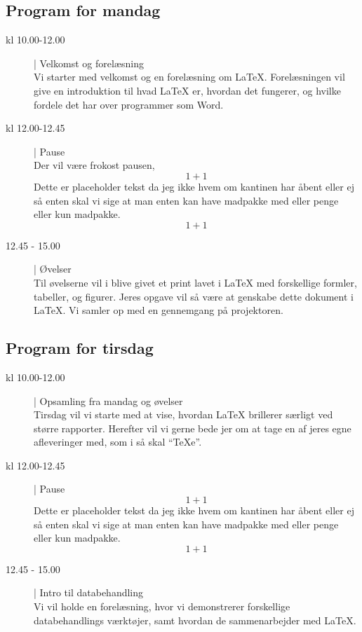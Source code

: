 \documentclass{article}                                                        %
\begin{document}
    \subsection{Program for mandag}
    \begin{description}
        \item[kl 10.00-12.00] | Velkomst og forelæsning ~ \\
        Vi starter med velkomst og en forelæsning om LaTeX.
        Forelæsningen vil give en introduktion til hvad LaTeX er, hvordan det
        fungerer, og hvilke fordele det har over programmer som Word.

        \item[kl 12.00-12.45] | Pause ~ \\
        Der vil være frokost pausen, 
        $$ 1+ 1$$
		Dette er placeholder tekst da jeg ikke hvem om kantinen har åbent eller ej
		så enten skal vi sige at man enten kan have madpakke med eller penge
		eller kun madpakke. 
		$$1+1$$

        \item[12.45 - 15.00] | Øvelser ~ \\
        Til øvelserne vil i blive givet et print lavet i LaTeX med forskellige
        formler, tabeller, og figurer. Jeres opgave vil så være at genskabe
        dette dokument i LaTeX. Vi samler op med en gennemgang på projektoren.
    \end{description}

    \subsection{Program for tirsdag}
    \begin{description}
        \item[kl 10.00-12.00] | Opsamling fra mandag og øvelser ~ \\
        Tirsdag vil vi starte med at vise, hvordan LaTeX brillerer særligt
        ved større rapporter. Herefter vil vi gerne bede jer om at tage en af
        jeres egne afleveringer med, som i så skal ``TeXe''.

        \item[kl 12.00-12.45] | Pause ~ \\
       $$ 1+ 1$$
		Dette er placeholder tekst da jeg ikke hvem om kantinen har åbent eller ej
		så enten skal vi sige at man enten kan have madpakke med eller penge
		eller kun madpakke. 
		$$1+1$$

        \item[12.45 - 15.00] | Intro til databehandling ~ \\
        Vi vil holde en forelæsning, hvor vi demonstrerer forskellige databehandlings
        værktøjer, samt hvordan de sammenarbejder med LaTeX.
    \end{description}
\end{document}
